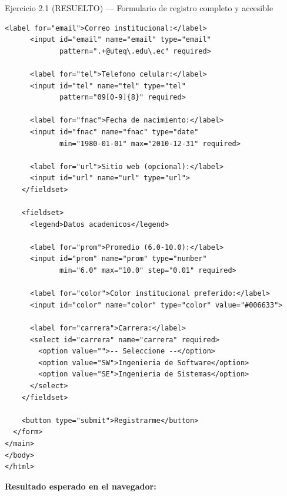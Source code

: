 \documentclass[11pt,a4paper,openany]{book}
\begin{document}
\begin{cajaejercicio}{Ejercicio 2.1 (RESUELTO) --- Formulario de registro completo y accesible}
\begin{lstlisting}[style=html,caption={registro.html},label=lst:2.14]
      <label for="email">Correo institucional:</label>
      <input id="email" name="email" type="email"
             pattern=".+@uteq\.edu\.ec" required>

      <label for="tel">Telefono celular:</label>
      <input id="tel" name="tel" type="tel"
             pattern="09[0-9]{8}" required>

      <label for="fnac">Fecha de nacimiento:</label>
      <input id="fnac" name="fnac" type="date"
             min="1980-01-01" max="2010-12-31" required>

      <label for="url">Sitio web (opcional):</label>
      <input id="url" name="url" type="url">
    </fieldset>

    <fieldset>
      <legend>Datos academicos</legend>

      <label for="prom">Promedio (6.0-10.0):</label>
      <input id="prom" name="prom" type="number"
             min="6.0" max="10.0" step="0.01" required>

      <label for="color">Color institucional preferido:</label>
      <input id="color" name="color" type="color" value="#006633">

      <label for="carrera">Carrera:</label>
      <select id="carrera" name="carrera" required>
        <option value="">-- Seleccione --</option>
        <option value="SW">Ingenieria de Software</option>
        <option value="SE">Ingenieria de Sistemas</option>
      </select>
    </fieldset>

    <button type="submit">Registrarme</button>
  </form>
</main>
</body>
</html>
\end{lstlisting}

\textbf{Resultado esperado en el navegador:}


\end{cajaejercicio}
\end{document}
